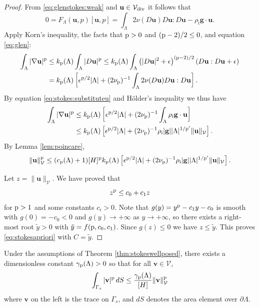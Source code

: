 \documentclass[hidelinks,onefignum,onetabnum,final]{siamart220329}  %
\newcommand{\eps}{\epsilon}
\newcommand{\grad}{\nabla}
\newcommand{\bg}{\mathbf{g}}
\newcommand{\bu}{\mathbf{u}}
\newcommand{\bv}{\mathbf{v}}
\newcommand{\cV}{\mathcal{V}}
\newcommand{\pp}{{\text{\textnormal{p}}}}
\newcommand{\rhoi}{\rho_{\text{i}}}
\newcommand{\Vdiv}{\cV_{\text{\textnormal{div}}}}
\begin{document}
\begin{proof}
From \eqref{eq:glenstokes:weak} and $\bu \in\Vdiv$ it follows that
\begin{equation}
0= F_\Lambda(\bu,p)[\bu,p] = \int_\Lambda 2 \nu(D\bu) D\bu : D\bu - \rhoi \bg \cdot \bu.  \label{eq:stokes:substituteu}
\end{equation}
Apply Korn's inequality, the facts that $\pp>0$ and $(\pp-2)/2 \le 0$, and equation \eqref{eq:glen}:
\begin{align}
\int_\Lambda |\grad\bu|^\pp &\le k_{\pp}(\Lambda) \int_\Lambda |D\bu|^\pp \le k_{\pp}(\Lambda) \int_\Lambda \left(|D\bu|^2 + \eps\right)^{(\pp-2)/2} \left(D\bu:D\bu + \eps\right) \label{eq:stokes:startapriori} \\
	&= k_{\pp}(\Lambda) \left[\eps^{\pp/2} |\Lambda| + (2 \nu_\pp)^{-1} \int_\Lambda 2\nu(D\bu) D\bu:D\bu\right]. \notag
\end{align}
By equation \eqref{eq:stokes:substituteu} and H\"older's inequality we thus have
\begin{align}
\int_\Lambda |\grad\bu|^\pp &\le k_{\pp}(\Lambda) \left[\eps^{\pp/2} |\Lambda| + (2 \nu_\pp)^{-1} \int_\Lambda \rhoi \bg \cdot \bu\right] \label{eq:stokes:workapriori} \\
	&\le k_{\pp}(\Lambda) \left[\eps^{\pp/2} |\Lambda| + (2 \nu_\pp)^{-1} \rhoi |\bg| |\Lambda|^{1/\pp'} \|\bu\|_\cV\right]. \notag
\end{align}
By Lemma \ref{lem:poincare},
\begin{equation}
\|\bu\|_{\cV}^\pp \le (c_{\pp}(\Lambda) + 1) [H]^\pp k_{\pp}(\Lambda) \left[\eps^{\pp/2} |\Lambda| + (2 \nu_\pp)^{-1} \rhoi |\bg| |\Lambda|^{1/\pp'} \|\bu\|_\cV\right].
\end{equation}

Let $z=\|\bu\|_\cV$.  We have proved that
\begin{equation}
z^\pp \le c_0 + c_1 z
\end{equation}
for $\pp>1$ and some constants $c_i>0$.  Note that $g(y) = y^\pp - c_1 y - c_0$ is smooth with $g(0)=-c_0<0$ and $g(y) \to +\infty$ as $y \to +\infty$, so there exists a right-most root $\tilde y>0$ with $\tilde y = f(\pp,c_0,c_1)$.  Since $g(z)\le 0$ we have $z \le \tilde y$.  This proves \eqref{eq:stokesapriori} with $C=\tilde y$.
\end{proof}

\begin{lemma} \label{lem:trace}
Under the assumptions of Theorem \ref{thm:stokeswellposed}, there exists a dimensionless constant $\gamma_{\pp}(\Lambda)>0$ so that for all $\bv \in \cV$,
\begin{equation}
\int_{\Gamma_s} |\bv|^\pp \,dS \le \frac{\gamma_{\pp}(\Lambda)}{[H]} \|\bv\|_{\cV}^\pp \label{eq:trace}
\end{equation}
where $\bv$ on the left is the trace on $\Gamma_s$, and $dS$ denotes the area element over $\partial\Lambda$.
\end{lemma}
\end{document}
